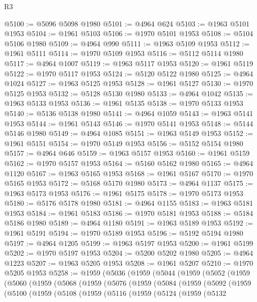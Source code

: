 \begin{lexlean}{R3}
\begin{coremodule}
@5100 := @5096 @5098 @1980
@5101 := @4964 @624
@5103 := @1963 @5101 @1953
@5104 := @1961 @5103
@5106 := @1970 @5101 @1953
@5108 := @5104 @5106 @1980
@5109 := @4964 @990
@5111 := @1963 @5109 @1953
@5112 := @1961 @5111
@5114 := @1970 @5109 @1953
@5116 := @5112 @5114 @1980
@5117 := @4964 @1007
@5119 := @1963 @5117 @1953
@5120 := @1961 @5119
@5122 := @1970 @5117 @1953
@5124 := @5120 @5122 @1980
@5125 := @4964 @1024
@5127 := @1963 @5125 @1953
@5128 := @1961 @5127
@5130 := @1970 @5125 @1953
@5132 := @5128 @5130 @1980
@5133 := @4964 @1042
@5135 := @1963 @5133 @1953
@5136 := @1961 @5135
@5138 := @1970 @5133 @1953
@5140 := @5136 @5138 @1980
@5141 := @4964 @1059
@5143 := @1963 @5141 @1953
@5144 := @1961 @5143
@5146 := @1970 @5141 @1953
@5148 := @5144 @5146 @1980
@5149 := @4964 @1085
@5151 := @1963 @5149 @1953
@5152 := @1961 @5151
@5154 := @1970 @5149 @1953
@5156 := @5152 @5154 @1980
@5157 := @4964 @646
@5159 := @1963 @5157 @1953
@5160 := @1961 @5159
@5162 := @1970 @5157 @1953
@5164 := @5160 @5162 @1980
@5165 := @4964 @1120
@5167 := @1963 @5165 @1953
@5168 := @1961 @5167
@5170 := @1970 @5165 @1953
@5172 := @5168 @5170 @1980
@5173 := @4964 @1137
@5175 := @1963 @5173 @1953
@5176 := @1961 @5175
@5178 := @1970 @5173 @1953
@5180 := @5176 @5178 @1980
@5181 := @4964 @1155
@5183 := @1963 @5181 @1953
@5184 := @1961 @5183
@5186 := @1970 @5181 @1953
@5188 := @5184 @5186 @1980
@5189 := @4964 @1180
@5191 := @1963 @5189 @1953
@5192 := @1961 @5191
@5194 := @1970 @5189 @1953
@5196 := @5192 @5194 @1980
@5197 := @4964 @1205
@5199 := @1963 @5197 @1953
@5200 := @1961 @5199
@5202 := @1970 @5197 @1953
@5204 := @5200 @5202 @1980
@5205 := @4964 @1223
@5207 := @1963 @5205 @1953
@5208 := @1961 @5207
@5210 := @1970 @5205 @1953
@5258 := @1959
    (@5036
      (@1959
        (@5044
          (@1959
            (@5052
              (@1959
                (@5060
                  (@1959
                    (@5068
                      (@1959
                        (@5076
                          (@1959
                            (@5084
                              (@1959
                                (@5092
                                  (@1959
                                    (@5100
                                      (@1959
                                        (@5108
                                          (@1959
                                            (@5116
                                              (@1959
                                                (@5124
                                                  (@1959
                                                    (@5132

\end{coremodule}
\end{lexlean}
